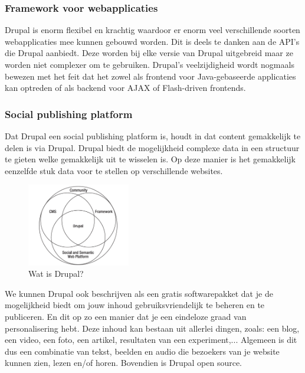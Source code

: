 \subsubsection{Framework voor webapplicaties}

Drupal is enorm flexibel en krachtig waardoor er enorm veel verschillende soorten webapplicaties mee kunnen gebouwd worden. Dit is deels te danken aan de API's die Drupal aanbiedt. Deze worden bij elke versie van Drupal uitgebreid maar ze worden niet complexer om te gebruiken. Drupal's veelzijdigheid wordt nogmaals bewezen met het feit dat het zowel als frontend voor Java-gebaseerde applicaties kan optreden of als backend voor AJAX of Flash-driven frontends.

\subsubsection{Social publishing platform}

Dat Drupal een social publishing platform is, houdt in dat content gemakkelijk te delen is via Drupal. Drupal biedt de mogelijkheid complexe data in een structuur te gieten welke gemakkelijk uit te wisselen is. Op deze manier is het gemakkelijk eenzelfde stuk data voor te stellen op verschillende websites.

\begin{figure}[h]
\centering
\includegraphics[width=0.4\textwidth]{fig/watIsDrupal}
\caption{Wat is Drupal?}
\vspace{-10pt}
\label{fig:watIsDrupal}
\end{figure}

We kunnen Drupal ook beschrijven als een gratis softwarepakket dat je de mogelijkheid biedt om jouw inhoud gebruiksvriendelijk te beheren en te publiceren. En dit op zo een manier dat je een eindeloze graad van personalisering hebt. Deze inhoud kan bestaan uit allerlei dingen, zoals: een blog, een video, een foto, een artikel, resultaten van een experiment,... Algemeen is dit dus een combinatie van tekst, beelden en audio die bezoekers van je website kunnen zien, lezen en/of horen. Bovendien is Drupal open source.

